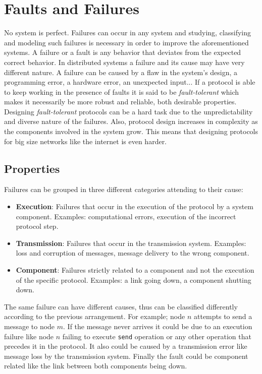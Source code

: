 \documentclass[..]{subfiles}
\begin{document}
\section{Faults and Failures}

No system is perfect. Failures can occur in any system and studying, classifying and modeling such failures is necessary in order to improve the aforementioned systems. A failure or a fault is any behavior that deviates from the expected correct behavior. In distributed systems a failure and its cause may have very different nature. A failure can be caused by a flaw in the system's design, a programming error, a hardware error, an unexpected input... If a protocol is able to keep working in the presence of faults it is said to be \textit{fault-tolerant} which makes it necessarily be more robust and reliable, both desirable properties. Designing \textit{fault-tolerant} protocols can be a hard task due to the unpredictability and diverse nature of the failures. Also, protocol design increases in complexity as the components involved in the system grow. This means that designing protocols for big size networks like the internet is even harder.

\subsection{Properties}

Failures can be grouped in three different categories attending to their cause:
\begin{itemize}
	\item \textbf{Execution}: Failures that occur in the execution of the protocol by a system component. Examples: computational errors, execution of the incorrect protocol step.
	\item \textbf{Transmission}: Failures that occur in the transmission system. Examples:  loss and corruption of messages, message delivery to the wrong component.
	\item \textbf{Component}: Failures strictly related to a component and not the execution of the specific protocol. Examples: a link going down, a component shutting down.
\end{itemize}
The same failure can have different causes, thus can be classified differently according to the previous arrangement. For example; node $n$ attempts to send a message to node $m$. If the message never arrives it could be due to an execution failure like node $n$ failing to execute \texttt{send} operation or any other operation that precedes it in the protocol. It also could be caused by a transmission error like message loss by the transmission system. Finally the fault could be component related like the link between both components being down.
\end{document}
